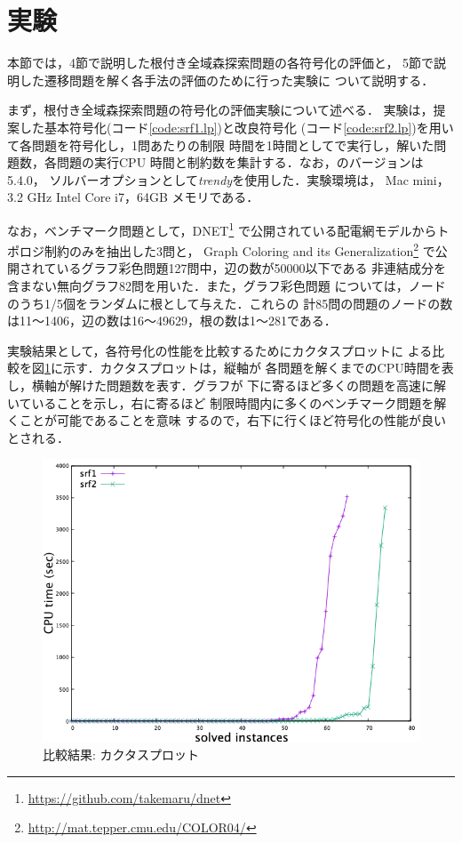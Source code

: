 \section{実験}
本節では，4節で説明した根付き全域森探索問題の各符号化の評価と，
5節で説明した遷移問題を解く各手法の評価のために行った実験に
ついて説明する．

まず，根付き全域森探索問題の符号化の評価実験について述べる．
実験は，提案した基本符号化(コード\ref{code:srf1.lp})と改良符号化
(コード\ref{code:srf2.lp})を用いて各問題を符号化し，1問あたりの制限
時間を1時間として\clingo で実行し，解いた問題数，各問題の実行CPU
時間と制約数を集計する．なお，\clingo のバージョンは 5.4.0，
ソルバーオプションとして\textit{trendy}を使用した．実験環境は，
Mac mini，3.2 GHz Intel Core i7，64GB メモリである．

なお，ベンチマーク問題として，DNET\footnote{\url{https://github.com/takemaru/dnet}}
で公開されている配電網モデルからトポロジ制約のみを抽出した3問と，
Graph Coloring and its Generalization\footnote{\url{http://mat.tepper.cmu.edu/COLOR04/}}
で公開されているグラフ彩色問題127問中，辺の数が50000以下である
非連結成分を含まない無向グラフ82問を用いた．また，グラフ彩色問題
については，ノードのうち1/5個をランダムに根として与えた．これらの
計85問の問題のノードの数は11〜1406，辺の数は16〜49629，根の数は1〜281である．

実験結果として，各符号化の性能を比較するためにカクタスプロットに
よる比較を図\ref{fig:cactus}に示す．カクタスプロットは，縦軸が
各問題を解くまでのCPU時間を表し，横軸が解けた問題数を表す．グラフが
下に寄るほど多くの問題を高速に解いていることを示し，右に寄るほど
制限時間内に多くのベンチマーク問題を解くことが可能であることを意味
するので，右下に行くほど符号化の性能が良いとされる．

\begin{figure}[htbp]
 \centering
 \includegraphics[scale=0.3]{fig/cactus.png}
 \caption{比較結果: カクタスプロット} 
 \label{fig:cactus}
\end{figure}

